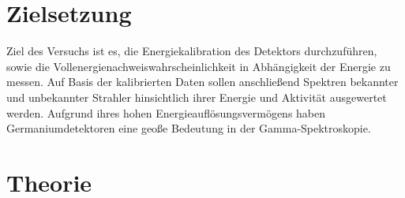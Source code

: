 \section{Zielsetzung}
\label{sec:Zielsetzung}
Ziel des Versuchs ist es, die Energiekalibration des Detektors durchzuführen, sowie 
die Vollenergienachweiswahrscheinlichkeit in Abhängigkeit der Energie zu messen. Auf Basis der kalibrierten Daten sollen 
anschließend Spektren bekannter und unbekannter Strahler hinsichtlich ihrer Energie und Aktivität ausgewertet werden.
Aufgrund ihres hohen Energieauflösungsvermögens haben Germaniumdetektoren eine geoße Bedeutung in der Gamma-Spektroskopie.


\section{Theorie}
\label{sec:Theorie}

\cite{sample}
